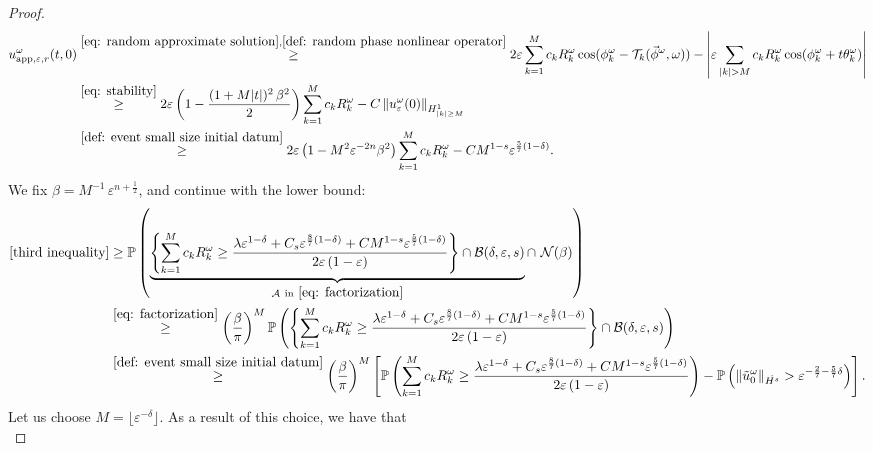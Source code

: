 \documentclass[a4paper,10pt,reqno]{article}
\theoremstyle{definition}
\theoremstyle{plain}
\theoremstyle{plain}
\theoremstyle{definition}
\theoremstyle{plain}
\theoremstyle{plain}
\theoremstyle{plain}
\theoremstyle{definition}
\theoremstyle{definition}
\newcommand{\norm}[1]{\left\lVert #1 \right\rVert}
\def \P{{\mathbb P}}
\def \B{\mathcal{B}}
\begin{document}
\begin{proof}
\[
\begin{split}
u_{\mathrm{app},\varepsilon,r}^{\omega}(t,0) & \stackrel{\eqref{eq: random approximate solution},\eqref{def: random phase nonlinear operator}}{\ge} 2 \varepsilon \sum_{k=1}^M c_k R_k^{\omega} \cos(\phi_k^{\omega} - \mathcal{T}_k(\vec{\phi}^{\omega},\omega))  - \left \lvert \varepsilon \sum_{|k| > M} c_k R_k^{\omega} \cos(\phi_k^{\omega} + t \theta_k^{\omega}) \right \rvert \\
& \stackrel{\eqref{eq: stability}}{\ge} 2 \varepsilon \left ( 1 - \frac{(1 + M |t|)^2\,\beta^2}{2} \right ) \sum_{k=1}^M c_k R_k^{\omega} - C \norm{u_{\varepsilon}^{\omega}(0)}_{H_{|k| \ge M}^1} \\
& \stackrel{\eqref{def: event small size initial datum}}{\ge} 2 \varepsilon \left ( 1 - M^2\varepsilon^{-2n}\beta^2 \right ) \sum_{k=1}^M c_k R_k^{\omega} - C M^{1-s} \varepsilon^{\frac{5}{7} (1-\delta)}.
\end{split}
\]
We fix $\beta= M^{-1}\, \varepsilon^{n+\frac12}$, and continue with the lower bound:
\[
\begin{split}
\eqref{third inequality} & \ge \P \left( \underbrace{\left \{ \sum_{k=1}^M c_k R_k^{\omega} \ge \frac{ \lambda \varepsilon^{1-\delta} + C_s \varepsilon^{\frac{8}{7}(1-\delta)} + C M^{1-s} \varepsilon^{\frac{5}{7}(1-\delta)} }{ 2\varepsilon\,(1 - \varepsilon)} \right \} \cap \B(\delta,\varepsilon,s)}_{\mathcal{A} \ \mathrm{in\ \eqref{eq: factorization}}} \cap \, \, \mathcal{N}(\beta) \right ) \\
& \stackrel{\eqref{eq: factorization}}{\ge} \left ( \frac{\beta}{\pi} \right )^M \P \left( \left \{ \sum_{k=1}^M c_k R_k^{\omega} \ge \frac{ \lambda \varepsilon^{1-\delta} + C_s \varepsilon^{\frac{8}{7}(1-\delta)} + C M^{1-s} \varepsilon^{\frac{5}{7}(1-\delta)} }{2 \varepsilon \left ( 1 - \varepsilon\right )} \right \} \cap \B(\delta,\varepsilon,s) \right ) \\
& \stackrel{\eqref{def: event small size initial datum}}{\ge} \left ( \frac{\beta}{\pi} \right )^M \left[ \P \left( \sum_{k=1}^M c_k R_k^{\omega} \ge \frac{ \lambda \varepsilon^{1-\delta} + C_s \varepsilon^{\frac{8}{7}(1-\delta)} + C M^{1-s} \varepsilon^{\frac{5}{7}(1-\delta)} }{2 \varepsilon \left ( 1 - \varepsilon\right )} \right ) - \P \left ( \norm{\tilde{u}_0^{\omega}}_{\dot{H^s}} > \varepsilon^{-\frac{2}{7}-\frac{5}{7}\delta} \right ) \right].
\end{split}
\]
Let us choose $M = \lfloor \varepsilon^{-\delta} \rfloor$. As a result of this choice, we have that
\begin{equation}\label{eq : pre liminf}

\end{equation}
\end{proof}
\end{document}
